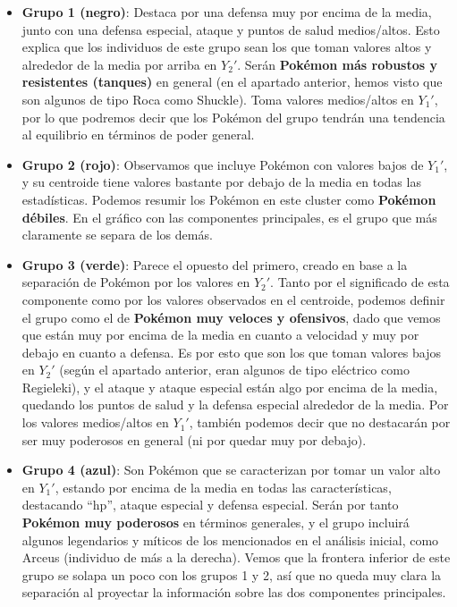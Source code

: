 \documentclass[
  11.8pt,
]{extreport}
\begin{document}
\begin{itemize}
\item
  \textbf{Grupo 1 (negro)}: Destaca por una defensa muy por encima de la
  media, junto con una defensa especial, ataque y puntos de salud
  medios/altos. Esto explica que los individuos de este grupo sean los
  que toman valores altos y alrededor de la media por arriba en
  \(Y_2'\). Serán \textbf{Pokémon más robustos y resistentes (tanques)}
  en general (en el apartado anterior, hemos visto que son algunos de
  tipo Roca como Shuckle). Toma valores medios/altos en \(Y_1'\), por lo
  que podremos decir que los Pokémon del grupo tendrán una tendencia al
  equilibrio en términos de poder general.
\item
  \textbf{Grupo 2 (rojo)}: Observamos que incluye Pokémon con valores
  bajos de \(Y_1'\), y su centroide tiene valores bastante por debajo de
  la media en todas las estadísticas. Podemos resumir los Pokémon en
  este cluster como \textbf{Pokémon débiles}. En el gráfico con las
  componentes principales, es el grupo que más claramente se separa de
  los demás.
\item
  \textbf{Grupo 3 (verde)}: Parece el opuesto del primero, creado en
  base a la separación de Pokémon por los valores en \(Y_2'\). Tanto por
  el significado de esta componente como por los valores observados en
  el centroide, podemos definir el grupo como el de \textbf{Pokémon muy
  veloces y ofensivos}, dado que vemos que están muy por encima de la
  media en cuanto a velocidad y muy por debajo en cuanto a defensa. Es
  por esto que son los que toman valores bajos en \(Y_2'\) (según el
  apartado anterior, eran algunos de tipo eléctrico como Regieleki), y
  el ataque y ataque especial están algo por encima de la media,
  quedando los puntos de salud y la defensa especial alrededor de la
  media. Por los valores medios/altos en \(Y_1'\), también podemos decir
  que no destacarán por ser muy poderosos en general (ni por quedar muy
  por debajo).
\item
  \textbf{Grupo 4 (azul)}: Son Pokémon que se caracterizan por tomar un
  valor alto en \(Y_1'\), estando por encima de la media en todas las
  características, destacando ``hp'', ataque especial y defensa
  especial. Serán por tanto \textbf{Pokémon muy poderosos} en términos
  generales, y el grupo incluirá algunos legendarios y míticos de los
  mencionados en el análisis inicial, como Arceus (individuo de más a la
  derecha). Vemos que la frontera inferior de este grupo se solapa un
  poco con los grupos 1 y 2, así que no queda muy clara la separación al
  proyectar la información sobre las dos componentes principales.
\end{itemize}
\end{document}
